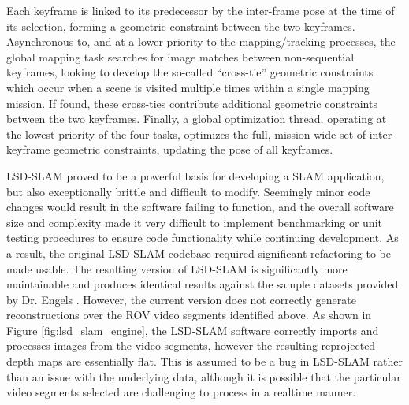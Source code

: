 \documentclass[letterpaper,12pt]{article}
\begin{document}
Each keyframe is linked to its predecessor by the inter-frame pose at the time of its selection, forming a geometric constraint between the two keyframes.   Asynchronous to, and at a lower priority to the mapping/tracking processes, the global mapping task searches for image matches between non-sequential keyframes, looking to develop the so-called ``cross-tie'' geometric constraints which occur when a scene is visited multiple times within a single mapping mission.   If found, these cross-ties contribute additional geometric constraints between the two keyframes.     Finally, a global optimization thread, operating at the lowest priority of the four tasks, optimizes the full, mission-wide set of inter-keyframe geometric constraints, updating the pose of all keyframes.   

LSD-SLAM proved to be a powerful basis for developing a SLAM application, but also exceptionally brittle and difficult to modify.  Seemingly minor code changes would result in the software failing to function, and the overall software size and complexity made it very difficult to implement benchmarking or unit testing procedures to ensure code functionality while continuing development.   As a result, the original LSD-SLAM codebase required significant refactoring to be made usable.  The resulting version of LSD-SLAM is significantly more maintainable and produces identical results against the sample datasets provided by Dr. Engels \cite{lsdslam}.   However, the current version does not correctly generate reconstructions over the ROV video segments identified above.  As shown in Figure \ref{fig:lsd_slam_engine}, the LSD-SLAM software correctly imports and processes images from the video segments, however the resulting reprojected depth maps are essentially flat.   This is assumed to be a bug in LSD-SLAM rather than an issue with the underlying data, although it is possible that the particular video segments selected are challenging to process in a realtime manner.
\end{document}
